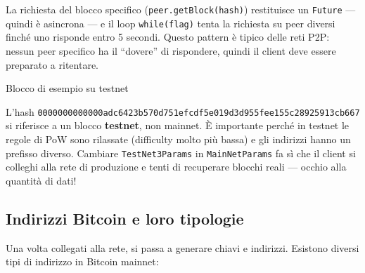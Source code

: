 \documentclass[
  italian,
  openany]{book}
\begin{document}
La richiesta del blocco specifico (\texttt{peer.getBlock(hash)})
restituisce un \texttt{Future} --- quindi è asincrona --- e il loop
\texttt{while(flag)} tenta la richiesta su peer diversi finché uno
risponde entro 5 secondi. Questo pattern è tipico delle reti P2P: nessun
peer specifico ha il ``dovere'' di rispondere, quindi il client deve
essere preparato a ritentare.

\begin{calloutwarning}{Blocco di esempio su testnet}

L'hash
\texttt{0000000000000adc6423b570d751efcdf5e019d3d955fee155c28925913cb667}
si riferisce a un blocco \textbf{testnet}, non mainnet. È importante
perché in testnet le regole di PoW sono rilassate (difficulty molto più
bassa) e gli indirizzi hanno un prefisso diverso. Cambiare
\texttt{TestNet3Params} in \texttt{MainNetParams} fa sì che il client si
colleghi alla rete di produzione e tenti di recuperare blocchi reali ---
occhio alla quantità di dati!

\end{calloutwarning}

\subsection{Indirizzi Bitcoin e loro
tipologie}\label{indirizzi-bitcoin-e-loro-tipologie}

Una volta collegati alla rete, si passa a generare chiavi e indirizzi.
Esistono diversi tipi di indirizzo in Bitcoin mainnet:
\end{document}
